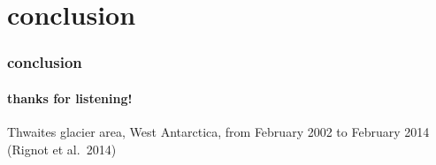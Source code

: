 \documentclass{beamer}
\begin{document}
\section*{conclusion}

\begin{frame}
  \frametitle{conclusion}
  \framesubtitle{thanks for listening!}

\begin{center}

\bigskip
\tiny
Thwaites glacier area, West Antarctica, from February 2002 to February 2014  (Rignot et al.~2014)
\end{center}

\end{frame}
\end{document}
